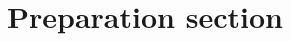 \documentclass[class=article, crop=false]{standalone}
\begin{document}
\section{Preparation section}
\end{document}
